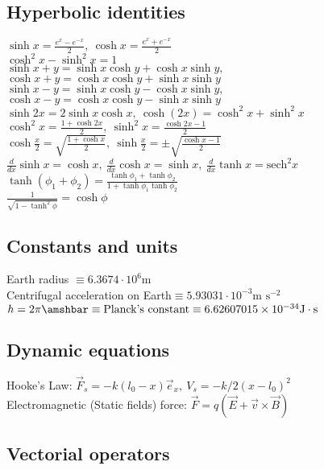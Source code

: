 \subsection{Hyperbolic identities}
$\sinh{x}=\frac{e^{x}-e^{-x}}{2},\ \cosh{x}=\frac{e^{x}+e^{-x}}{2}$\\
$\cosh^{2}{x}-\sinh^{2}{x}=1$\\
$\sinh{x+y}=\sinh{x}\cosh{y}+\cosh{x}\sinh{y},$\\
$\cosh{x+y}=\cosh{x}\cosh{y}+\sinh{x}\sinh{y}$
 \\ $\sinh{x-y}=\sinh{x}\cosh{y}-\cosh{x}\sinh{y},$\\
 $\cosh{x-y}=\cosh{x}\cosh{y}-\sinh{x}\sinh{y}$
 \\ $\sinh{2x}=2\sinh{x}\cosh{x},\ \cosh{(2x)}=\cosh^2{x}+\sinh^2{x}$\\
 $\cosh^2{x}=\frac{1+\cosh{2x}}{2},\ \sinh^2{x}=\frac{\cosh{2x}-1}{2}$
 \\ $\cosh{\frac{x}{2}}=\sqrt{\frac{1+\cosh{x}}{2}},\ \sinh{\frac{x}{2}}=\pm\sqrt{\frac{\cosh{x}-1}{2}}$
 \\ $\frac{d}{dx}\sinh x=\cosh x,\ \frac{d}{dx}\cosh x=\sinh x,\ \frac{d}{dx}\tanh x=\text{sech}^2{x}$\\
$ \tanh{(\phi_{1}+\phi_{2})}=\frac{\tanh{\phi_{1}}+\tanh{\phi_{2}}}{1+\tanh{\phi_{1}}\tanh{\phi_{2}}}$\\
$\frac{1}{\sqrt{1-\tanh^{2}{\phi}}}=\cosh{\phi}$



\subsection{Constants and units}
Earth radius $\equiv6.3674\cdot 10^{6}\text{m}$\\
Centrifugal acceleration on Earth$\equiv 5.93031\cdot 10^{-3}\text{m s}^{-2}$\\
$h=2\pi\amshbar\equiv\text{Planck's constant}\equiv 6.62607015\times 10^{-34}\text{J}\cdot \text{s}$




\subsection{Dynamic equations}
Hooke's Law: $\vec{F}_{s}=-k(l_{0}-x)\vec{e}_{x},\ V_{s}=-k/2(x-l_{0})^{2}$\\
Electromagnetic (Static fields) force: $\vec{F}=q(\vec{E}+\vec{v}\times\vec{B})$




\subsection{Vectorial operators}
